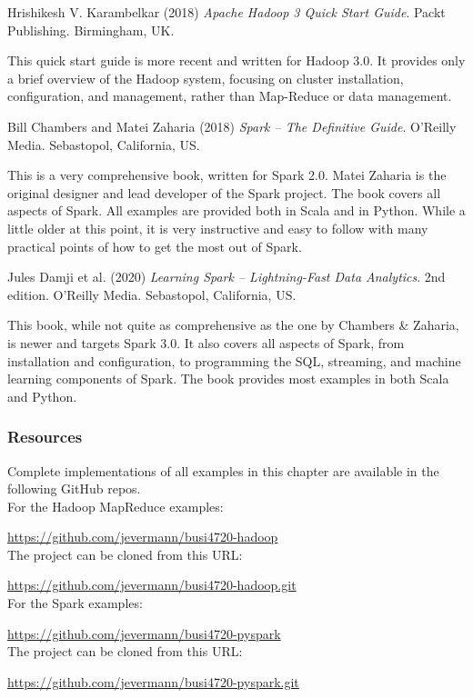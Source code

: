 \begin{tcolorbox}[colback=alert]
Hrishikesh V. Karambelkar (2018) \emph{Apache Hadoop 3 Quick Start Guide}. Packt Publishing. Birmingham, UK.
\end{tcolorbox}

This quick start guide is more recent and written for Hadoop 3.0. It provides only a brief overview of the Hadoop system, focusing on cluster installation, configuration, and management, rather than Map-Reduce or data management.

\begin{tcolorbox}[colback=alert]
Bill Chambers and Matei Zaharia (2018) \emph{Spark -- The Definitive Guide}. O'Reilly Media. Sebastopol, California, US.
\end{tcolorbox}

This is a very comprehensive book, written for Spark 2.0. Matei Zaharia is the original designer and lead developer of the Spark project. The book covers all aspects of Spark. All examples are provided both in Scala and in Python. While a little older at this point, it is very instructive and easy to follow with many practical points of how to get the most out of Spark.

\begin{tcolorbox}[colback=alert]
Jules Damji et al. (2020) \emph{Learning Spark -- Lightning-Fast Data Analytics}. 2nd edition. O'Reilly Media. Sebastopol, California, US.
\end{tcolorbox}

This book, while not quite as comprehensive as the one by Chambers \& Zaharia, is newer and targets Spark 3.0. It also covers all aspects of Spark, from installation and configuration, to programming the SQL, streaming, and machine learning components of Spark. The book provides most examples in both Scala and Python.

\begin{tcolorbox}[colback=alert]
\subsubsection*{Resources}
Complete implementations of all examples in this chapter are available in the following GitHub repos.\\

For the Hadoop MapReduce examples:

\url{https://github.com/jevermann/busi4720-hadoop} \\

The project can be cloned from this URL:

\url{https://github.com/jevermann/busi4720-hadoop.git} \\

For the Spark examples:

\url{https://github.com/jevermann/busi4720-pyspark} \\

The project can be cloned from this URL:

\url{https://github.com/jevermann/busi4720-pyspark.git} \\
\end{tcolorbox}

